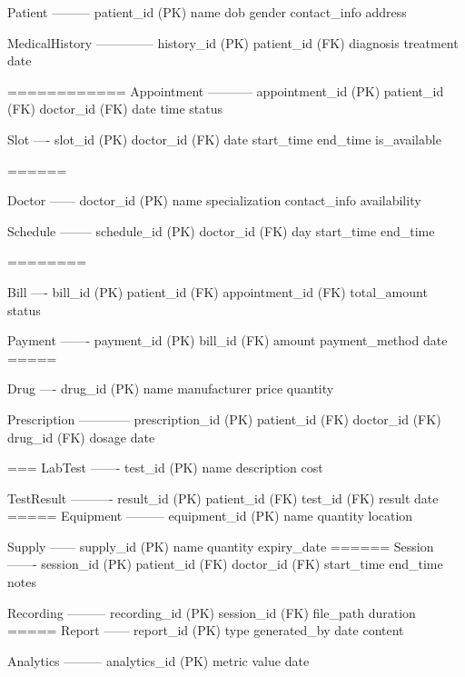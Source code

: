 Patient
---------
patient_id (PK)
name
dob
gender
contact_info
address

MedicalHistory
--------------
history_id (PK)
patient_id (FK)
diagnosis
treatment
date

============
Appointment
-----------
appointment_id (PK)
patient_id (FK)
doctor_id (FK)
date
time
status

Slot
----
slot_id (PK)
doctor_id (FK)
date
start_time
end_time
is_available

======

Doctor
------
doctor_id (PK)
name
specialization
contact_info
availability

Schedule
--------
schedule_id (PK)
doctor_id (FK)
day
start_time
end_time

========

Bill
----
bill_id (PK)
patient_id (FK)
appointment_id (FK)
total_amount
status

Payment
-------
payment_id (PK)
bill_id (FK)
amount
payment_method
date
=====

Drug
----
drug_id (PK)
name
manufacturer
price
quantity

Prescription
------------
prescription_id (PK)
patient_id (FK)
doctor_id (FK)
drug_id (FK)
dosage
date

===
LabTest
-------
test_id (PK)
name
description
cost

TestResult
----------
result_id (PK)
patient_id (FK)
test_id (FK)
result
date
=====
Equipment
---------
equipment_id (PK)
name
quantity
location

Supply
------
supply_id (PK)
name
quantity
expiry_date
======
Session
-------
session_id (PK)
patient_id (FK)
doctor_id (FK)
start_time
end_time
notes

Recording
---------
recording_id (PK)
session_id (FK)
file_path
duration
=====
Report
------
report_id (PK)
type
generated_by
date
content

Analytics
---------
analytics_id (PK)
metric
value
date